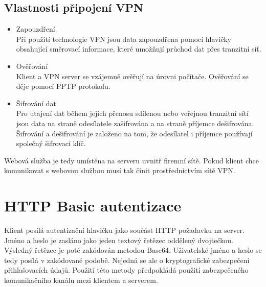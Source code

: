 \documentclass{bakalarka}
\begin{document}
\subsection*{Vlastnosti připojení VPN}
\begin{itemize}[noitemsep,nolistsep]
\item Zapouzdření\\ Při použití technologie VPN jsou data zapouzdřena pomocí hlavičky obsahující směrovací informace, které umožňují průchod dat přes tranzitní síť.
\item Ověřování\\
Klient a VPN server se vzájemně ověřují na úrovni počítače. Ověřování  se děje pomocí PPTP protokolu. 
\item Šifrování dat\\
Pro utajení dat během jejich přenosu sdílenou nebo veřejnou tranzitní sítí jsou data na straně odesílatele zašifrována a na straně příjemce dešifrována. Šifrování a dešifrování je založeno na tom, že odesílatel i příjemce používají společný šifrovací klíč.
\end{itemize}

Webová služba je tedy umístěna na serveru uvnitř firemní sítě. Pokud klient chce komunikovat s webovou službou musí tak činit 
prostřednictvím sítě VPN.

\section{HTTP Basic autentizace}
Klient posílá autentizační hlavičku jako součást HTTP požadavku na server. Jméno a heslo je zasláno jako jeden textový řetězec oddělený dvojtečkou. Výsledný řetězec je poté zakódován metodou Base64. Uživatelské jméno a heslo se tedy posílá v zakódované podobě. Nejedná se ale o kryptografické zabezpečení přihlašovacích údajů. Použití této metody předpokládá použití zabezpečeného komunikačního kanálu mezi klientem a serverem.
\end{document}

